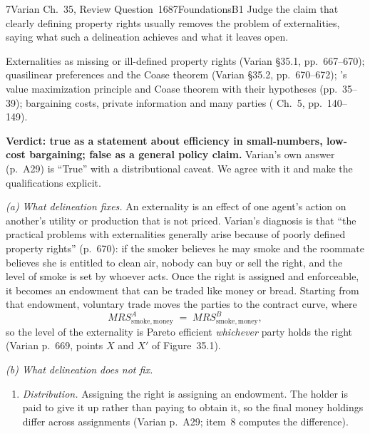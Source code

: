 \begin{exsol}{7}{Varian Ch.~35, Review Question~1}{687}{Foundations}{B1}
\asked Judge the claim that clearly defining property rights usually removes the problem of
externalities, saying what such a delineation achieves and what it leaves open.

\method Externalities as missing or ill-defined property rights (Varian \S35.1, pp.~667--670);
quasilinear preferences and the Coase theorem (Varian \S35.2, pp.~670--672); \MR's value
maximization principle and Coase theorem with their hypotheses (pp.~35--39); bargaining costs,
private information and many parties (\MR{} Ch.~5, pp.~140--149).

\solution
\textbf{Verdict: true as a statement about efficiency in small-numbers, low-cost bargaining; false
as a general policy claim.} Varian's own answer (p.~A29) is ``True'' with a distributional
caveat. We agree with it and make the qualifications explicit.

\emph{(a) What delineation fixes.} An externality is an effect of one agent's action on another's
utility or production that is not priced. Varian's diagnosis is that ``the practical problems with
externalities generally arise because of poorly defined property rights'' (p.~670): if the smoker
believes he may smoke and the roommate believes she is entitled to clean air, nobody can buy or
sell the right, and the level of smoke is set by whoever acts. Once the right is assigned and
enforceable, it becomes an endowment that can be traded like money or bread. Starting from that
endowment, voluntary trade moves the parties to the contract curve, where
\[
  MRS^A_{\text{smoke},\,\text{money}} \;=\; MRS^B_{\text{smoke},\,\text{money}},
\]
so the level of the externality is Pareto efficient \emph{whichever} party holds the right
(Varian p.~669, points $X$ and $X'$ of Figure~35.1).

\emph{(b) What delineation does not fix.}
\begin{enumerate}[label=(\roman*)]
  \item \emph{Distribution.} Assigning the right is assigning an endowment. The holder is paid
  to give it up rather than paying to obtain it, so the final money holdings differ across
  assignments (Varian p.~A29; item~8 computes the difference).


\end{enumerate}
\end{exsol}
